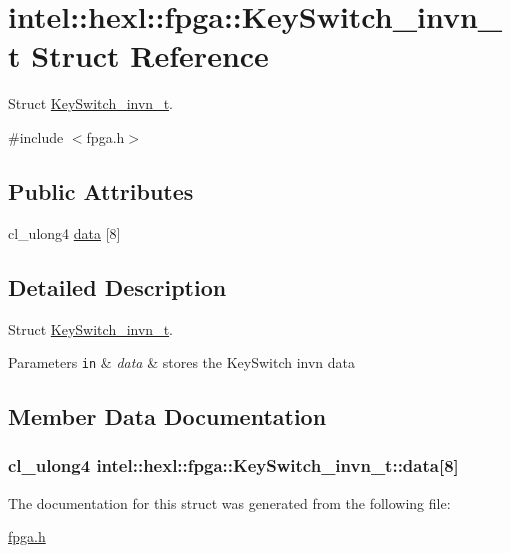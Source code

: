 \hypertarget{structintel_1_1hexl_1_1fpga_1_1KeySwitch__invn__t}{\section{intel\-:\-:hexl\-:\-:fpga\-:\-:Key\-Switch\-\_\-invn\-\_\-t Struct Reference}
\label{structintel_1_1hexl_1_1fpga_1_1KeySwitch__invn__t}
}


Struct \hyperlink{structintel_1_1hexl_1_1fpga_1_1KeySwitch__invn__t}{Key\-Switch\-\_\-invn\-\_\-t}.  




{\ttfamily \#include $<$fpga.\-h$>$}

\subsection*{Public Attributes}
\begin{DoxyCompactItemize}
\item 
cl\-\_\-ulong4 \hyperlink{structintel_1_1hexl_1_1fpga_1_1KeySwitch__invn__t_ad62ffdfe6b8126bed2872efb28d1f659}{data} \mbox{[}8\mbox{]}
\end{DoxyCompactItemize}


\subsection{Detailed Description}
Struct \hyperlink{structintel_1_1hexl_1_1fpga_1_1KeySwitch__invn__t}{Key\-Switch\-\_\-invn\-\_\-t}. 


\begin{DoxyParams}[1]{Parameters}
\mbox{\tt in}  & {\em data} & stores the Key\-Switch invn data \\
\hline
\end{DoxyParams}


\subsection{Member Data Documentation}
\hypertarget{structintel_1_1hexl_1_1fpga_1_1KeySwitch__invn__t_ad62ffdfe6b8126bed2872efb28d1f659}{
\subsubsection[{data}]{\setlength{\rightskip}{0pt plus 5cm}cl\-\_\-ulong4 intel\-::hexl\-::fpga\-::\-Key\-Switch\-\_\-invn\-\_\-t\-::data\mbox{[}8\mbox{]}}}\label{structintel_1_1hexl_1_1fpga_1_1KeySwitch__invn__t_ad62ffdfe6b8126bed2872efb28d1f659}


The documentation for this struct was generated from the following file\-:\begin{DoxyCompactItemize}
\item 
\hyperlink{fpga_8h}{fpga.\-h}\end{DoxyCompactItemize}
